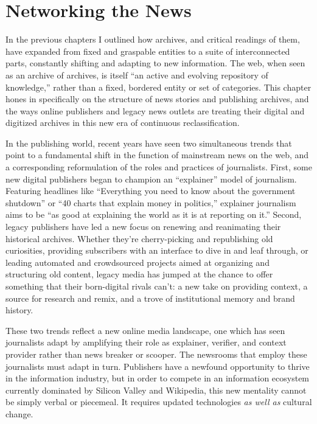 \chapter{Networking the News}

In the previous chapters I outlined how archives, and critical readings of them, have expanded from fixed and graspable entities to a suite of interconnected parts, constantly shifting and adapting to new information. The web, when seen as an archive of archives, is itself ``an active and evolving repository of knowledge,'' rather than a fixed, bordered entity or set of categories.\autocite[2]{chakrabarti_mining_2003} This chapter hones in specifically on the structure of news stories and publishing archives, and the ways online publishers and legacy news outlets are treating their digital and digitized archives in this new era of continuous reclassification.


In the publishing world, recent years have seen two simultaneous trends that point to a fundamental shift in the function of mainstream news on the web, and a corresponding reformulation of the roles and practices of journalists. First, some new digital publishers began to champion an ``explainer'' model of journalism. Featuring headlines like ``Everything you need to know about the government shutdown'' or ``40 charts that explain money in politics,'' explainer journalism aims to be ``as good at explaining the world as it is at reporting on it.''\autocite{klein_vox_2014} Second, legacy publishers have led a new focus on renewing and reanimating their historical archives. Whether they're cherry-picking and republishing old curiosities, providing subscribers with an interface to dive in and leaf through, or leading automated and crowdsourced projects aimed at organizing and structuring old content, legacy media has jumped at the chance to offer something that their born-digital rivals can't: a new take on providing context, a source for research and remix, and a trove of institutional memory and brand history.

These two trends reflect a new online media landscape, one which has seen journalists adapt by amplifying their role as explainer, verifier, and context provider rather than news breaker or scooper. The newsrooms that employ these journalists must adapt in turn. Publishers have a newfound opportunity to thrive in the information industry, but in order to compete in an information ecosystem currently dominated by Silicon Valley and Wikipedia, this new mentality cannot be simply verbal or piecemeal. It requires updated technologies \emph{as well as} cultural change.

